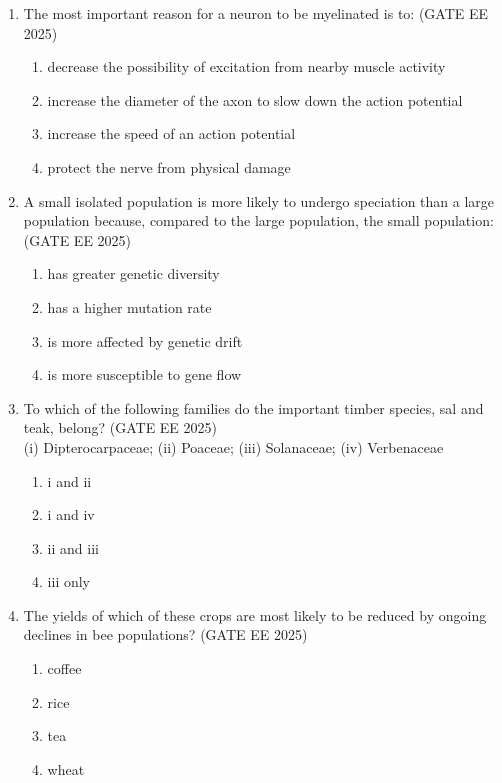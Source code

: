 \begin{enumerate}[leftmargin=*,label=\textbf{Q.\arabic*},resume]

\item The most important reason for a neuron to be myelinated is to: \hfill {(GATE EE 2025)}
\begin{multicols}{2}
\begin{enumerate}
\item decrease the possibility of excitation from nearby muscle activity
\item increase the diameter of the axon to slow down the action potential
\item increase the speed of an action potential
\item protect the nerve from physical damage
\end{enumerate}
\end{multicols}


\item A small isolated population is more likely to undergo speciation than a large population because, compared to the large population, the small population: \hfill {(GATE EE 2025)}
\begin{multicols}{2}
\begin{enumerate}
\item has greater genetic diversity
\item has a higher mutation rate
\item is more affected by genetic drift
\item is more susceptible to gene flow
\end{enumerate}
\end{multicols}


\item To which of the following families do the important timber species, sal and teak, belong? \hfill {(GATE EE 2025)} \\
(i) Dipterocarpaceae; (ii) Poaceae; (iii) Solanaceae; (iv) Verbenaceae
\begin{multicols}{2}
\begin{enumerate}
\item i and ii
\item i and iv
\item ii and iii
\item iii only
\end{enumerate}
\end{multicols}


\item The yields of which of these crops are most likely to be reduced by ongoing declines in bee populations? \hfill {(GATE EE 2025)}
\begin{multicols}{2}
\begin{enumerate}
\item coffee
\item rice
\item tea
\item wheat
\end{enumerate}
\end{multicols}



\end{enumerate}
